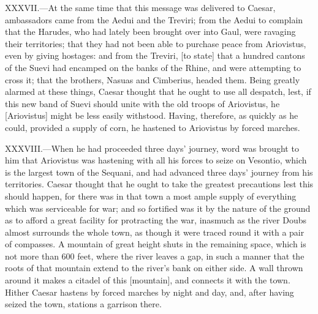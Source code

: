 XXXVII.—At the same time that this message was delivered to Caesar,
ambassadors came from the Aedui and the Treviri; from the Aedui to
complain that the Harudes, who had lately been brought over into Gaul,
were ravaging their territories; that they had not been able to purchase
peace from Ariovistus, even by giving hostages: and from the Treviri,
[to state] that a hundred cantons of the Suevi had encamped on the banks
of the Rhine, and were attempting to cross it; that the brothers, Nasuas
and Cimberius, headed them. Being greatly alarmed at these things,
Caesar thought that he ought to use all despatch, lest, if this new band
of Suevi should unite with the old troops of Ariovistus, he [Ariovistus]
might be less easily withstood. Having, therefore, as quickly as he
could, provided a supply of corn, he hastened to Ariovistus by forced
marches.

XXXVIII.—When he had proceeded three days' journey, word was brought to
him that Ariovistus was hastening with all his forces to seize on
Vesontio, which is the largest town of the Sequani, and had advanced
three days' journey from his territories. Caesar thought that he ought
to take the greatest precautions lest this should happen, for there was
in that town a most ample supply of everything which was serviceable for
war; and so fortified was it by the nature of the ground as to afford a
great facility for protracting the war, inasmuch as the river Doubs
almost surrounds the whole town, as though it were traced round it with
a pair of compasses. A mountain of great height shuts in the remaining
space, which is not more than 600 feet, where the river leaves a gap, in
such a manner that the roots of that mountain extend to the river's bank
on either side. A wall thrown around it makes a citadel of this
[mountain], and connects it with the town. Hither Caesar hastens by
forced marches by night and day, and, after having seized the town,
stations a garrison there.

